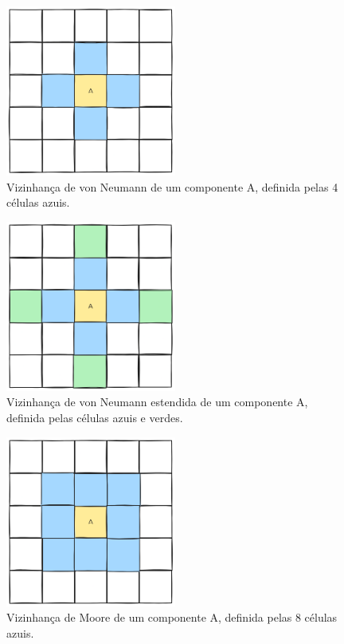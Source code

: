 \documentclass[12pt,oneside]{report}
\begin{document}
\begin{figure}[H]
    \centering
    \includegraphics[width=0.5\textwidth]{vizinhanca_von_neumann.png}
    \caption{\small Vizinhança de von Neumann de um componente A, definida pelas 4 células azuis.}
    \label{fig:vizinhanca_von_neumann}
\end{figure}

\begin{figure}[H]
    \centering
    \includegraphics[width=0.5\textwidth]{vizinhanca_von_neumann_estendida.png}
    \caption{\small Vizinhança de von Neumann estendida de um componente A, definida pelas células azuis e verdes.}
    \label{fig:vizinhanca_von_neumann_estendida}
\end{figure}

\begin{figure}[H]
    \centering
    \includegraphics[width=0.5\textwidth]{vizinhanca_moore.png}
    \caption{\small Vizinhança de Moore de um componente A, definida pelas 8 células azuis.}
    \label{fig:vizinhanca_moore}
\end{figure}
\end{document}
